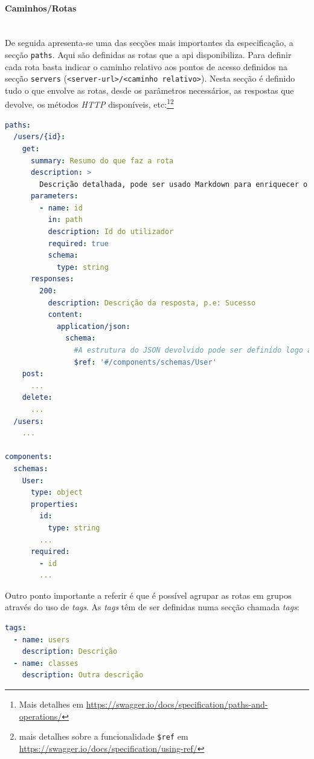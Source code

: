 \paragraph{Caminhos/Rotas} \mbox{} \\
De seguida apresenta-se uma das secções mais importantes da especificação, a secção \texttt{paths}. 
Aqui são definidas as rotas que a \acrshort{api} disponibiliza. Para definir cada rota basta indicar o caminho 
relativo aos pontos de acesso definidos na secção \texttt{servers} (\verb|<server-url>/<caminho relativo>|). 
Nesta secção é definido tudo o que envolve as rotas, desde os parâmetros necessários, as respostas que devolve, 
os métodos \textit{HTTP} disponíveis, etc:\footnote{Mais detalhes em \url{https://swagger.io/docs/specification/paths-and-operations/}}\footnote{mais detalhes sobre a funcionalidade \texttt{\$ref} em \url{https://swagger.io/docs/specification/using-ref/}}
\begin{lstlisting}[language=yaml, caption=Exemplo de secção \texttt{paths} indicando os detalhes de cada rota na especificação \textit{OpenAPI}, label={exem:oapiRota}]
paths:
  /users/{id}:
    get:
      summary: Resumo do que faz a rota
      description: >
        Descrição detalhada, pode ser usado Markdown para enriquecer o texto
      parameters:
        - name: id
          in: path
          description: Id do utilizador
          required: true
          schema:
            type: string
      responses:
        200:
          description: Descrição da resposta, p.e: Sucesso
          content:
            application/json:
              schema:
                #A estrutura do JSON devolvido pode ser definido logo aqui ou num componente à parte, fazendo referência desse. Iremos aplicar o segundo caso para demonstrar que estas funcionalidades tornam a documentação mais fácil de manter
                $ref: '#/components/schemas/User'
    post:
      ...
    delete:
      ...
  /users:
    ...

components:
  schemas:
    User:
      type: object
      properties:
        id:
          type: string
        ...
      required:
        - id
        ...
\end{lstlisting}

Outro ponto importante a referir é que é possível agrupar as rotas em grupos através do uso de \textit{tags}. 
As \textit{tags} têm de ser definidas numa secção chamada \textit{tags}:
\begin{lstlisting}[language=yaml, caption={Exemplo de secção \texttt{tags} definindo tags na especificação \textit{OpenAPI}}]
tags:
  - name: users
    description: Descrição
  - name: classes
    description: Outra descrição
\end{lstlisting}

